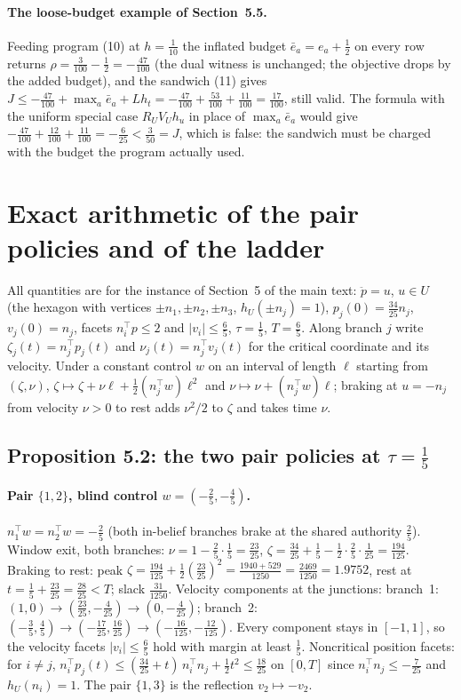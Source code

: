 \documentclass[11pt,a4paper]{article}
\theoremstyle{plain}
\theoremstyle{definition}
\theoremstyle{remark}
\newcommand{\ebar}{\bar e}
\newcommand{\tfr}[2]{\tfrac{#1}{#2}}
\begin{document}
\paragraph{The loose-budget example of Section~5.5.}
Feeding program (10) at $h=\tfr1{10}$ the inflated budget $\ebar_a=e_a+\tfr12$ on every row returns $\rho=\tfr3{100}-\tfr12=-\tfr{47}{100}$ (the dual witness is unchanged; the objective drops by the added budget), and the sandwich (11) gives $J\le-\tfr{47}{100}+\max_a\ebar_a+Lh_t=-\tfr{47}{100}+\tfr{53}{100}+\tfr{11}{100}=\tfr{17}{100}$, still valid. The formula with the uniform special case $R_UV_Uh_u$ in place of $\max_a\ebar_a$ would give $-\tfr{47}{100}+\tfr{12}{100}+\tfr{11}{100}=-\tfr6{25}<\tfr3{50}=J$, which is false: the sandwich must be charged with the budget the program actually used.
\section{Exact arithmetic of the pair policies and of the ladder}\label{S:pairs}

All quantities are for the instance of Section~5 of the main text: $\ddot p=u$, $u\in U$ (the hexagon with vertices $\pm n_1,\pm n_2,\pm n_3$, $h_U(\pm n_j)=1$), $p_j(0)=\tfr{34}{25}n_j$, $v_j(0)=n_j$, facets $n_i^\top p\le2$ and $|v_i|\le\tfr65$, $\tau=\tfr15$, $T=\tfr65$. Along branch $j$ write $\zeta_j(t)=n_j^\top p_j(t)$ and $\nu_j(t)=n_j^\top v_j(t)$ for the critical coordinate and its velocity. Under a constant control $w$ on an interval of length $\ell$ starting from $(\zeta,\nu)$, $\zeta\mapsto\zeta+\nu\ell+\tfrac12(n_j^\top w)\ell^2$ and $\nu\mapsto\nu+(n_j^\top w)\ell$; braking at $u=-n_j$ from velocity $\nu>0$ to rest adds $\nu^2/2$ to $\zeta$ and takes time $\nu$.

\subsection{Proposition 5.2: the two pair policies at $\tau=\tfr15$}

\paragraph{Pair $\{1,2\}$, blind control $w=(-\tfr25,-\tfr45)$.}
$n_1^\top w=n_2^\top w=-\tfr25$ (both in-belief branches brake at the shared authority $\tfr25$). Window exit, both branches: $\nu=1-\tfr25\cdot\tfr15=\tfr{23}{25}$, $\zeta=\tfr{34}{25}+\tfr15-\tfrac12\cdot\tfr25\cdot\tfr1{25}=\tfr{194}{125}$. Braking to rest: peak $\zeta=\tfr{194}{125}+\tfrac12(\tfr{23}{25})^2=\tfr{1940+529}{1250}=\tfr{2469}{1250}=1.9752$, rest at $t=\tfr15+\tfr{23}{25}=\tfr{28}{25}<T$; slack $\tfr{31}{1250}$. Velocity components at the junctions: branch~1: $(1,0)\to(\tfr{23}{25},-\tfr4{25})\to(0,-\tfr4{25})$; branch~2: $(-\tfr35,\tfr45)\to(-\tfr{17}{25},\tfr{16}{25})\to(-\tfr{16}{125},-\tfr{12}{125})$. Every component stays in $[-1,1]$, so the velocity facets $|v_i|\le\tfr65$ hold with margin at least $\tfr15$. Noncritical position facets: for $i\ne j$, $n_i^\top p_j(t)\le(\tfr{34}{25}+t)\,n_i^\top n_j+\tfrac12t^2\le\tfr{18}{25}$ on $[0,T]$ since $n_i^\top n_j\le-\tfr7{25}$ and $h_U(n_i)=1$. The pair $\{1,3\}$ is the reflection $v_2\mapsto-v_2$.
\end{document}
